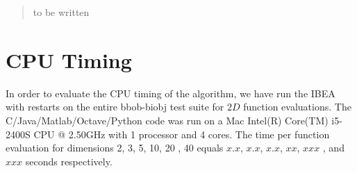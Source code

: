 \documentclass{sig-alternate}
\newcommand{\change}[1]{{\color{red} #1}}
\begin{document}

\maketitle
\begin{abstract}
to be written
\end{abstract}




%
%
%

\section{CPU Timing}
In order to evaluate the CPU timing of the algorithm, we have run the \change{IBEA} with restarts on the entire bbob-biobj test suite \cite{biobj2016func} for $2 D$ function evaluations. The \change{C/Java/Matlab/Octave/Python} code was run on a \change{Mac Intel(R) Core(TM) i5-2400S CPU @ 2.50GHz} with \change{1} processor and \change{4} cores. The time per function evaluation for dimensions 2, 3, 5, 10, 20\change{, 40} equals \change{$x.x$}, \change{$x.x$}, \change{$x.x$}, \change{$xx$}, \change{$xxx$}\change{, and $xxx$} seconds respectively. 
\end{document}
